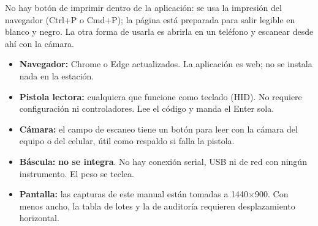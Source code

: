 
\vspace{6pt}

No hay botón de imprimir dentro de la aplicación: se usa la impresión del navegador
(Ctrl+P o Cmd+P); la página está preparada para salir legible en blanco y negro.
La otra forma de usarla es abrirla en un teléfono y escanear desde ahí con la cámara.

\newpage
{}

\begin{itemize}
    \item \textbf{Navegador:} Chrome o Edge actualizados. La aplicación es web; no se
          instala nada en la estación.
    \item \textbf{Pistola lectora:} cualquiera que funcione como teclado (HID). No
          requiere configuración ni controladores. Lee el código y manda el Enter sola.
    \item \textbf{Cámara:} el campo de escaneo tiene un botón para leer con la cámara del
          equipo o del celular, útil como respaldo si falla la pistola.
    \item \textbf{Báscula:} \textbf{no se integra}. No hay conexión serial, USB ni de red
          con ningún instrumento. El peso se teclea.
    \item \textbf{Pantalla:} las capturas de este manual están tomadas a 1440$\times$900.
          Con menos ancho, la tabla de lotes y la de auditoría requieren desplazamiento
          horizontal.
\end{itemize}

\newpage
{}

